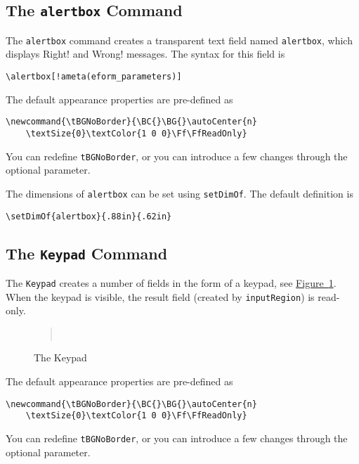 \documentclass{article}
\makeatletter
\let\uif\textsf
\let\bslash=\@backslashchar
\def\cs#1{\texttt{\bslash#1}}
\makeatother
\begin{document}
\subsection{The \texorpdfstring{\protect\cs{alertbox}}{} Command}\label{alertbox}

The \cs{alertbox} command creates a transparent text field named
\texttt{alertbox}, which displays \uif{Right!} and \uif{Wrong!}
messages. The syntax for this field is
\begin{Verbatim}[xleftmargin=\amtIndent,commandchars=!()]
\alertbox[!ameta(eform_parameters)]
\end{Verbatim}
The default appearance properties are pre-defined as
\begin{Verbatim}[xleftmargin=\amtIndent]
\newcommand{\tBGNoBorder}{\BC{}\BG{}\autoCenter{n}
    \textSize{0}\textColor{1 0 0}\Ff\FfReadOnly}
\end{Verbatim}
You can redefine \cs{tBGNoBorder}, or you can introduce a few changes through
the optional parameter.

The dimensions of \texttt{alertbox} can be set using \cs{setDimOf}. The default definition is
\begin{Verbatim}[xleftmargin=\amtIndent]
\setDimOf{alertbox}{.88in}{.62in}
\end{Verbatim}

\subsection{The \texorpdfstring{\protect\cs{Keypad}}{} Command}\label{keypad}

The \cs{Keypad} creates a number of fields in the form of a keypad, see
\hyperref[keypad]{Figure~\ref*{keypad}}. When the keypad is visible, the
result field (created by \cs{inputRegion}) is read-only.

\begin{figure}[htb]
\begin{quote}
\settowidth{\totaltextwidth}{Figure 0: The Keypad}
\begin{minipage}{\totaltextwidth}\centering
\setlength{\fboxsep}{0pt}
\\
\caption{The Keypad}\label{keypad}
\end{minipage}
\end{quote}
\end{figure}

\newtopic\noindent
The default appearance properties are pre-defined as
\begin{Verbatim}[xleftmargin=\amtIndent]
\newcommand{\tBGNoBorder}{\BC{}\BG{}\autoCenter{n}
    \textSize{0}\textColor{1 0 0}\Ff\FfReadOnly}
\end{Verbatim}
You can redefine \cs{tBGNoBorder}, or you can introduce a few changes through the optional parameter.
\end{document}
